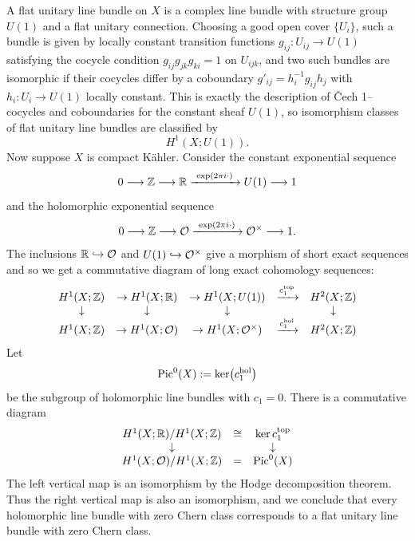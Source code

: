 \documentclass[12pt]{article}
\begin{document}
\begin{solution}
    A flat unitary line bundle on $X$ is a complex line bundle with structure
group $U(1)$ and a flat unitary connection.  Choosing a good open cover
$\{U_i\}$, such a bundle is given by locally constant transition functions
$g_{ij}\colon U_{ij}\to U(1)$ satisfying the cocycle condition
$g_{ij}g_{jk}g_{ki}=1$ on $U_{ijk}$, and two such bundles are isomorphic if
their cocycles differ by a coboundary $g'_{ij}=h_i^{-1}g_{ij}h_j$ with
$h_i\colon U_i\to U(1)$ locally constant.  This is exactly the description
of Čech 1--cocycles and coboundaries for the constant sheaf $U(1)$, so
isomorphism classes of flat unitary line bundles are classified by
\[
H^1(X;U(1)).
\]
Now suppose $X$ is compact K\"ahler.  Consider the constant exponential
sequence
\[
0\longrightarrow \mathbb{Z} \longrightarrow \mathbb{R}
\xrightarrow{\ \exp(2\pi i\cdot)\ }
U(1)\longrightarrow 1
\]
and the holomorphic exponential sequence
\[
0\longrightarrow \mathbb{Z} \longrightarrow {\mathcal{O}}
\xrightarrow{\ \exp(2\pi i\cdot)\ }
{\mathcal{O}}^\times\longrightarrow 1.
\]
The inclusions $\mathbb{R}\hookrightarrow{\mathcal{O}}$ and $U(1)\hookrightarrow{\mathcal{O}}^\times$
give a morphism of short exact sequences and so we get a commutative diagram of long exact cohomology sequences:
\begin{align*}
\begin{array}{ccccccccc}
  H^1(X;\mathbb{Z}) &\to H^1(X;\mathbb{R}) &\to H^1(X;U(1)) &\xrightarrow{c_1^{\mathrm{top}}} &H^2(X;\mathbb{Z})
  \\  
  \downarrow &\downarrow &\downarrow & & \downarrow
  \\
  H^1(X;\mathbb{Z}) &\to H^1(X;{\mathcal{O}}) &\to H^1(X;{\mathcal{O}}^\times) &\xrightarrow{c_1^{\mathrm{hol}}} &H^2(X;\mathbb{Z})
\end{array}
\end{align*}
Let
\[
\operatorname{Pic}^0(X):=\ker\bigl(c_1^{\mathrm{hol}}\bigr)
\]
be the subgroup of holomorphic line bundles with $c_1=0$.
There is a commutative diagram
\begin{align*}
\begin{array}{ccc}
H^1(X;\mathbb{R})/H^1(X;\mathbb{Z}) &\cong & \ker c_1^{\mathrm{top}}
\\
\downarrow & &\downarrow
\\
H^1(X;{\mathcal{O}})/H^1(X;\mathbb{Z}) & = & \operatorname{Pic}^0(X)
\end{array}
\end{align*}
The left vertical map is an isomorphism by the Hodge decomposition theorem. Thus the right vertical map is also an isomorphism, and we conclude that every holomorphic line bundle with zero Chern class corresponds to a flat unitary line bundle with zero Chern class.
\end{solution} 
\end{document}
